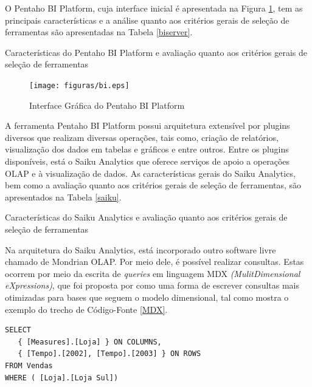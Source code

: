 O Pentaho BI Platform, cuja interface inicial é apresentada na Figura \ref{BIplatform}, tem as principais características e a análise quanto aos critérios gerais de seleção de ferramentas são apresentadas na Tabela \ref{biserver}. 


\begin{table}[!ht]

\caption{Características do Pentaho BI Platform e avaliação quanto aos critérios gerais de seleção de ferramentas}
\label{biserver}
\end{table}
\FloatBarrier



\begin{figure}[ht!]
\begin{center}
\texttt{[image: figuras/bi.eps]}
\caption{Interface Gráfica do Pentaho BI Platform}
\label{BIplatform}
\end{center}
\end{figure}
\FloatBarrier
 

A ferramenta Pentaho BI Platform possui arquitetura extensível por plugins diversos que realizam diversas operações, tais como, criação de relatórios, visualização dos dados em tabelas e gráficos e entre outros. Entre os plugins disponíveis, está o Saiku Analytics que oferece serviços de apoio a operações OLAP e à visualização de dados. As características gerais do Saiku Analytics, bem como a avaliação quanto aos critérios gerais de seleção de ferramentas, são apresentados na Tabela \ref{saiku}. 

\begin{table}[!ht]

\caption{Características do Saiku Analytics e avaliação quanto aos critérios gerais de seleção de ferramentas}
\label{saiku}
\end{table}
\FloatBarrier

Na arquitetura do Saiku Analytics, está incorporado outro software livre chamado de Mondrian OLAP. Por meio dele, é possível realizar  consultas. Estas ocorrem por meio da escrita de \textit{queries} em linguagem MDX \textit{(MulitDimensional eXpressions)}, que foi proposta por  como uma forma de escrever consultas mais otimizadas para bases que seguem o modelo dimensional, tal como mostra o exemplo do trecho de Código-Fonte \ref{MDX}.


\begin{center}
\begin{minipage}{0.5\textwidth}

\begin{lstlisting}[caption=Exemplo de \textit{Query} em linguagem MDX, label=MDX]
 SELECT
   { [Measures].[Loja] } ON COLUMNS,
   { [Tempo].[2002], [Tempo].[2003] } ON ROWS
FROM Vendas
WHERE ( [Loja].[Loja Sul]) 

\end{lstlisting}
\end{minipage}
\end{center}
\FloatBarrier

